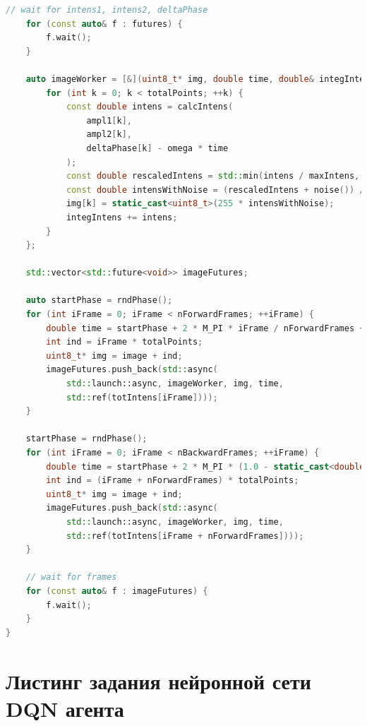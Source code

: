 \begin{lstlisting}[language=C++,tabsize=4,label={lst:calcImage},caption={Листинг функции вычисления интерференционной картины}]
    // wait for intens1, intens2, deltaPhase
	for (const auto& f : futures) {
		f.wait();
	}

    auto imageWorker = [&](uint8_t* img, double time, double& integIntens) {
        for (int k = 0; k < totalPoints; ++k) {
            const double intens = calcIntens(
                ampl1[k], 
                ampl2[k], 
                deltaPhase[k] - omega * time
            );
            const double rescaledIntens = std::min(intens / maxIntens, 1.0);
            const double intensWithNoise = (rescaledIntens + noise()) / (1 + noiseCoeff);
            img[k] = static_cast<uint8_t>(255 * intensWithNoise);
            integIntens += intens;
        }
    };

    std::vector<std::future<void>> imageFutures;

    auto startPhase = rndPhase();
    for (int iFrame = 0; iFrame < nForwardFrames; ++iFrame) {
        double time = startPhase + 2 * M_PI * iFrame / nForwardFrames + piezoNoise();
        int ind = iFrame * totalPoints;
        uint8_t* img = image + ind;
        imageFutures.push_back(std::async(
            std::launch::async, imageWorker, img, time,
            std::ref(totIntens[iFrame])));
    }

    startPhase = rndPhase();
    for (int iFrame = 0; iFrame < nBackwardFrames; ++iFrame) {
        double time = startPhase + 2 * M_PI * (1.0 - static_cast<double>(iFrame) / nBackwardFrames) + piezoNoise();
        int ind = (iFrame + nForwardFrames) * totalPoints;
        uint8_t* img = image + ind;
        imageFutures.push_back(std::async(
            std::launch::async, imageWorker, img, time,
            std::ref(totIntens[iFrame + nForwardFrames])));
    }

    // wait for frames
    for (const auto& f : imageFutures) {
        f.wait();
    }
}
\end{lstlisting}

\section{Листинг задания нейронной сети DQN агента}\label{app:A4}

